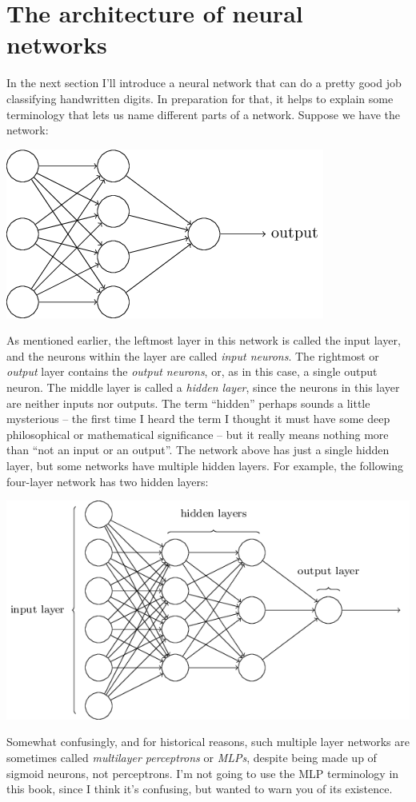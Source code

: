 \documentclass[a4paper,twoside,10pt]{book}
\begin{document}
\section{The architecture of neural networks}
In the next section I'll introduce a neural network that can do a pretty good job classifying handwritten digits. In preparation for that, it helps to explain some terminology that lets us name different parts of a network. Suppose we have the network:

\begin{center}
	\includegraphics[scale=0.5]{./figures/ch1/tikz10}
\end{center}
As mentioned earlier, the leftmost layer in this network is called the input layer, and the neurons within the layer are called \textit{input neurons}. The rightmost or \textit{output} layer contains the \textit{output neurons}, or, as in this case, a single output neuron. The middle layer is called a \textit{hidden layer}, since the neurons in this layer are neither inputs nor outputs. The term ``hidden'' perhaps sounds a little mysterious -- the first time I heard the term I thought it must have some deep philosophical or mathematical significance -- but it really means nothing more than ``not an input or an output''. The network above has just a single hidden layer, but some networks have multiple hidden layers. For example, the following four-layer network has two hidden layers:

\begin{center}
	\includegraphics[scale=0.5]{./figures/ch1/tikz11}
\end{center}
Somewhat confusingly, and for historical reasons, such multiple layer networks are sometimes called \textit{multilayer perceptrons} or \textit{MLPs}, despite being made up of sigmoid neurons, not perceptrons. I'm not going to use the MLP terminology in this book, since I think it's confusing, but wanted to warn you of its existence.
\end{document}
